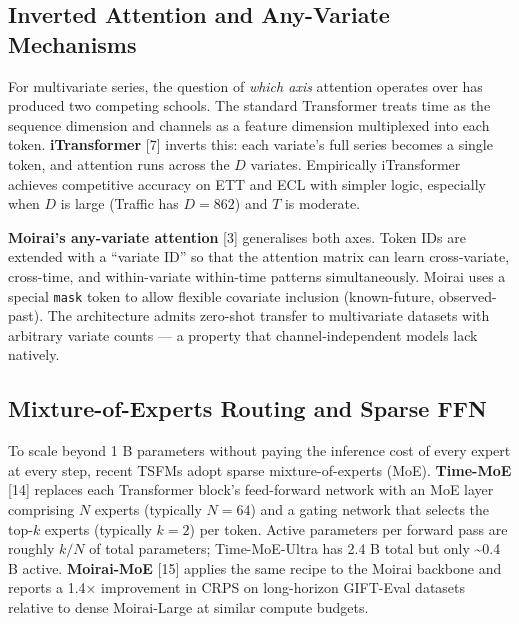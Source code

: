 \documentclass{article}
\begin{document}
\subsection{Inverted Attention and Any-Variate Mechanisms}\label{inverted-attention-and-any-variate-mechanisms}

For multivariate series, the question of \emph{which axis} attention operates over has produced two competing schools. The standard Transformer treats time as the sequence dimension and channels as a feature dimension multiplexed into each token. \textbf{iTransformer} \citep{liu2024itransformerinvert} {[}7{]} inverts this: each variate's full series becomes a single token, and attention runs across the \(D\) variates. Empirically iTransformer achieves competitive accuracy on ETT and ECL with simpler logic, especially when \(D\) is large (Traffic has \(D=862\)) and \(T\) is moderate.

\textbf{Moirai's any-variate attention} {[}3{]} generalises both axes. Token IDs are extended with a ``variate ID'' so that the attention matrix can learn cross-variate, cross-time, and within-variate within-time patterns simultaneously. Moirai uses a special \texttt{mask} token to allow flexible covariate inclusion (known-future, observed-past). The architecture admits zero-shot transfer to multivariate datasets with arbitrary variate counts --- a property that channel-independent models lack natively.

\subsection{Mixture-of-Experts Routing and Sparse FFN}\label{mixture-of-experts-routing-and-sparse-ffn}

To scale beyond 1 B parameters without paying the inference cost of every expert at every step, recent TSFMs adopt sparse mixture-of-experts (MoE). \textbf{Time-MoE} \citep{shi2024timemoebillionscal} {[}14{]} replaces each Transformer block's feed-forward network with an MoE layer comprising \(N\) experts (typically \(N=64\)) and a gating network that selects the top-\(k\) experts (typically \(k=2\)) per token. Active parameters per forward pass are roughly \(k/N\) of total parameters; Time-MoE-Ultra has 2.4 B total but only \textasciitilde0.4 B active. \textbf{Moirai-MoE} \citep{liu2024itransformerinvert} {[}15{]} applies the same recipe to the Moirai backbone and reports a 1.4× improvement in CRPS on long-horizon GIFT-Eval datasets relative to dense Moirai-Large at similar compute budgets.
\end{document}
